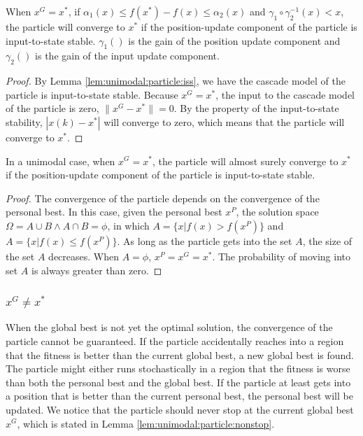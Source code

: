 \begin{mythm}
\label{thm:unimodal:particle:garuantee_converge}
When $ x^{G} = x^{*} $,  if $ \alpha_{1} (x) \leq f(x^{*}) - f(x) \leq \alpha_{2} (x) $ and $ \gamma_{1} \circ \gamma_{2}^{-1} (x)  < x $, the particle will converge to $ x^{*} $ if the position-update component of the particle is input-to-state stable.
$ \gamma_{1} () $ is the gain of the position update component and $ \gamma_{2} () $ is the gain of the input update component.
\begin{proof}
By Lemma \ref{lem:unimodal:particle:iss}, we have the cascade model of the particle is input-to-state stable.
Because $ x^{G} = x^{*} $, the input to the cascade model of the particle is zero, $ \lVert x^{G} - x^{*} \rVert = 0 $.
By the property of the input-to-state stability, $ | x(k) - x^{*} | $ will converge to zero, which means that the particle will converge to $ x^{*} $.
\end{proof}
\end{mythm}



\begin{mythm}
\label{thm:unimodal:particle:converge}
In a unimodal case, when $ x^{G} = x^{*} $, the particle will almost surely converge to $ x^{*} $ if the position-update component of the particle is input-to-state stable.
\begin{proof}
The convergence of the particle depends on the convergence of the personal best.
In this case, given the personal best $ x^{P} $, the solution space $ \Omega = A \cup B \land A \cap B = \phi $, in which 
$ A = \{ x | f(x) > f(x^{P}) \} $ and $ A = \{ x | f(x) \leq f(x^{P}) \} $.
As long as the particle gets into the set $ A $, the size of the set $ A $ decreases.
When $ A = \phi $, $ x^{P} = x^{G} = x^{*} $.
The probability of moving into set $ A $ is always greater than zero.
\end{proof}
\end{mythm}

\subsubsection{ $ x^{G} \not = x^{*}  $ }

When the global best is not yet the optimal solution, the convergence of the particle cannot be guaranteed.
If the particle accidentally reaches into a region that the fitness is better than the current global best, a new global best is found.
The particle might either runs stochastically in a region that the fitness is worse than both the personal best and the global best.
If the particle at least gets into a position that is better than the current personal best, the personal best will be updated. 
We notice that the particle should never stop at the current global best $ x^{G} $, which is stated in Lemma \ref{lem:unimodal:particle:nonstop}.

